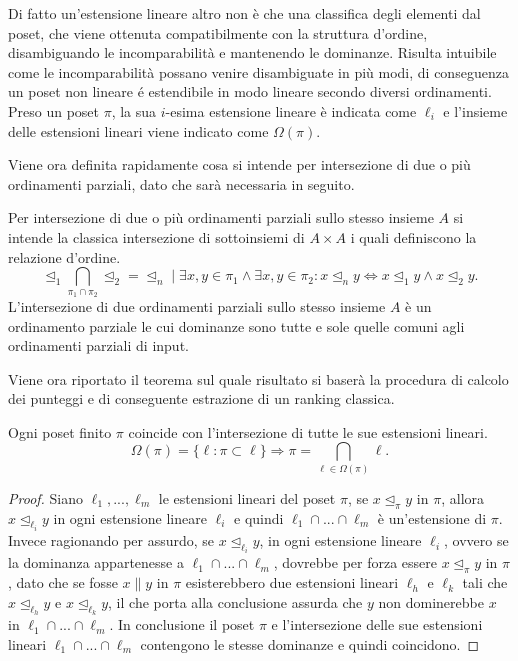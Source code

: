 \documentclass{report}
\begin{document}
Di fatto un'estensione lineare altro non è che una classifica degli elementi dal poset, che viene ottenuta compatibilmente con la struttura d'ordine, disambiguando le incomparabilità e mantenendo le dominanze. Risulta intuibile come le incomparabilità possano venire disambiguate in più modi, di conseguenza un poset non lineare é estendibile in modo lineare secondo diversi ordinamenti. Preso un poset $\pi$, la sua $i$-esima estensione lineare è indicata come $\ell_i$ e l'insieme delle estensioni lineari viene indicato come $\Omega(\pi)$.


Viene ora definita rapidamente cosa si intende per intersezione di due o più ordinamenti parziali, dato che sarà necessaria in seguito. 
\begin{definition}[Intersezione]
Per intersezione di due o più ordinamenti parziali sullo stesso insieme $A$ si intende la classica intersezione di sottoinsiemi di $A\times A$ i quali definiscono la relazione d'ordine. 
\[\unlhd_1 \bigcap_{\pi_1 \cap \pi_2} \unlhd_2 = \unlhd_n \;\vert\; \exists x,y\in \pi_1 \land \exists x,y\in \pi_2 : x \unlhd_n y \Leftrightarrow x \unlhd_1 y \land x \unlhd_2 y.\]
L’intersezione di due ordinamenti parziali sullo stesso insieme $A$ è un ordinamento parziale le cui dominanze sono tutte e sole quelle comuni agli ordinamenti parziali di input.
\end{definition}


Viene ora riportato il teorema sul quale risultato si baserà la procedura di calcolo dei punteggi e di conseguente estrazione di un ranking classica.\\

\begin{theorem}
Ogni poset finito $\pi$ coincide con l'intersezione di tutte le sue estensioni lineari.
\[\Omega(\pi)=\{\ell : \pi \subset \ell\}\Rightarrow \pi=\bigcap_{\ell \in \Omega(\pi)}\ell.\]
\end{theorem}

\renewcommand\qedsymbol{c.v.d.}
\begin{proof}
Siano $\ell_1, ..., \ell_m$ le estensioni lineari del poset $\pi$, se $x \unlhd_{\pi} y$ in $\pi$, allora $x \unlhd_{\ell_i} y$ in ogni estensione lineare $\ell_i$ e quindi $\ell_1 \cap ... \cap \ell_m$ è un'estensione di $\pi$. 
Invece ragionando per assurdo, se $x \unlhd_{\ell_i} y$, in ogni estensione lineare $\ell_i$, ovvero se la dominanza appartenesse a $\ell_1 \cap ... \cap \ell_m$, dovrebbe per forza essere $x \unlhd_{\pi} y$ in $\pi$, dato che se fosse $x \parallel y$ in $\pi$ esisterebbero due estensioni lineari $\ell_h$ e $\ell_k$ tali che $x \unlhd_{\ell_h} y$ e $x \unlhd_{\ell_k} y$, il che porta alla conclusione assurda che $y$ non dominerebbe $x$ in $\ell_1 \cap ... \cap \ell_m$. In conclusione il poset $\pi$ e l'intersezione delle sue estensioni lineari $\ell_1 \cap ... \cap \ell_m$ contengono le stesse dominanze e quindi coincidono.
\end{proof}
\end{document}
